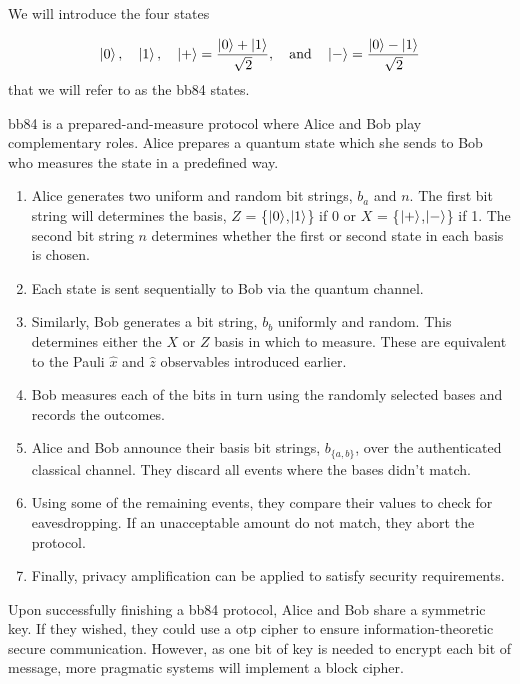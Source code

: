 We will introduce the four states

\begin{equation}
	\ket{0}, \quad \ket{1}, \quad \ket{+} = \frac{\ket{0} + \ket{1}}{\sqrt{2}}, \quad \text{and} \quad \ket{-} = \frac{\ket{0} - \ket{1}}{\sqrt{2}}
\end{equation}
that we will refer to as the \ac{bb84} states.

\Ac{bb84} is a {\color{bristol-red}prepared-and-measure} protocol where Alice and Bob play complementary roles. Alice {\color{bristol-red}prepares} a quantum state which she sends to Bob who {\color{bristol-red}measures} the state in a predefined way. 

\begin{algorithm}
\begin{enumerate}
	\item Alice generates two uniform and random bit strings, $b_a$ and $n$. The first bit string will determines the basis, $Z$ = \{$\ket{0}$,$\ket{1}$\} if 0 or $X$ =  \{$\ket{+}$,$\ket{-}$\} if 1. The second bit string $n$ determines whether the first or second state in each basis is chosen. 
	\item Each state is sent sequentially to Bob via the quantum channel.
	\item Similarly, Bob generates a bit string, $b_b$ uniformly and random. This determines either the $X$ or $Z$ basis in which to measure. These are equivalent to the Pauli $\hat{x}$ and $\hat{z}$ observables introduced earlier.
	\item Bob measures each of the bits in turn using the randomly selected bases and records the outcomes.
	\item Alice and Bob announce their basis bit strings, $b_{\{a,b\}}$, over the authenticated classical channel. They discard all events where the bases didn't match.
	\item Using some of the remaining events, they compare their values to check for eavesdropping. If an unacceptable amount do not match, they abort the protocol.
	\item Finally, privacy amplification can be applied to satisfy security requirements.
\end{enumerate}
\end{algorithm}

Upon successfully finishing a \ac{bb84} protocol, Alice and Bob share a symmetric key. If they wished, they could use a \ac{otp} cipher to ensure information-theoretic secure communication. However, as one bit of key is needed to encrypt each bit of message, more pragmatic systems will implement a block cipher. 


